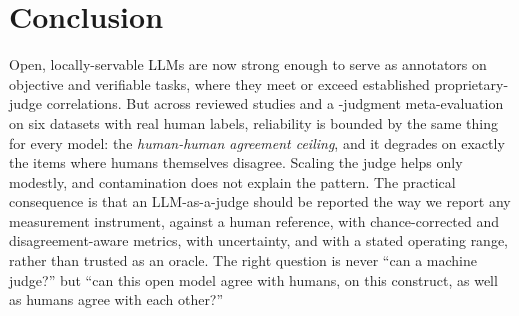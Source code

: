 \section{Conclusion}
Open, locally-servable LLMs are now strong enough to serve as annotators on objective and verifiable tasks, where
they meet or exceed established proprietary-judge correlations. But across \Nstudies{} reviewed studies and a
\STHRn{}-judgment meta-evaluation on six datasets with real human labels, reliability is bounded by the same thing
for every model: the \emph{human-human agreement ceiling}, and it degrades on exactly the items where humans
themselves disagree. Scaling the judge helps only modestly, and contamination does not explain the pattern. The
practical consequence is that an LLM-as-a-judge should be reported the way we report any measurement instrument,
against a human reference, with chance-corrected and disagreement-aware metrics, with uncertainty, and with a stated
operating range, rather than trusted as an oracle. The right question is never ``can a machine judge?'' but ``can
this open model agree with humans, on this construct, as well as humans agree with each other?''
